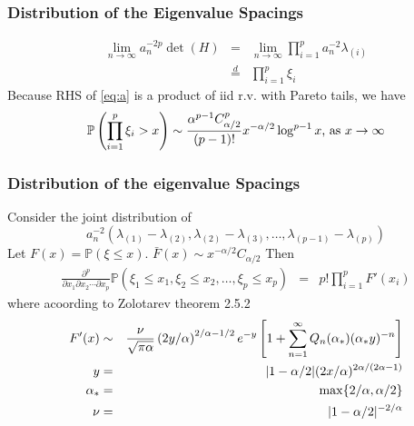 \documentclass{beamer}
\renewcommand{\P}{
\mathbb P
}
\begin{document}
\begin{frame}
  \frametitle{Distribution of the Eigenvalue Spacings}
  \begin{eqnarray*}
    \lim_{n \to \infty} a_n^{-2p} \det(H) &=& \lim_{n \to \infty}
    \prod_{i=1}^p a_n^{-2} \lambda_{(i)} \nonumber \\
    &\overset{d}{=}& \prod_{i=1}^p \xi_{i} \label{eq:a}
  \end{eqnarray*}
  Because RHS of \eqref{eq:a} is a product of iid r.v. with Pareto
  tails, we have
  \[
  \P\left(
    \prod_{i=1}^p \xi_{i} > x
  \right) \sim {\alpha^{p-1} C_{\alpha/2}^p \over (p-1)!}  x^{-\alpha/2} \log^{p-1} x 
  \text{, as } x \to \infty
  \]
\end{frame}

\begin{frame}
  \frametitle{Distribution of the eigenvalue Spacings}
  Consider the joint distribution of
  \[
  a_n^{-2}(\lambda_{(1)} - \lambda_{(2)}, \lambda_{(2)} - \lambda_{(3)},
  \dots, \lambda_{(p-1)} - \lambda_{(p)})
  \]
  Let $F(x) = \P(\xi \leq x)$. $\bar{F}(x) \sim x^{-\alpha/2}
  C_{\alpha/2}$
Then
\begin{eqnarray*}
\frac{\partial^p}{\partial x_1\partial x_2 \cdots \partial x_p}
\P(\xi_1 \leq x_1, \xi_2 \leq x_2, \dots, \xi_p \leq x_p)
&=& p! \prod_{i=1}^p F'(x_i)
\end{eqnarray*}
where acoording to Zolotarev \cite{Zolotarev1983} theorem 2.5.2
\begin{eqnarray*}
  F'(x) &\sim& {\nu \over \sqrt{\pi \alpha}} \left(2y/\alpha\right)^{2/\alpha - 1/2}
  e^{-y} \left[
    1 + \sum_{n=1}^\infty Q_n(\alpha_*) (\alpha_* y)^{-n}
  \right] \\
  y &=& |1 - \alpha/2|(2x/\alpha)^{2\alpha/(2\alpha-1)}\\
  \alpha_* &=& \max\{2/\alpha, \alpha/2\} \\
  \nu &=& |1 - \alpha/2|^{-2/\alpha}
\end{eqnarray*}
\end{frame}

  
\end{document}
